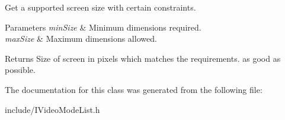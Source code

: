 Get a supported screen size with certain constraints. 


\begin{DoxyParams}{Parameters}
{\em min\+Size} & Minimum dimensions required. \\
\hline
{\em max\+Size} & Maximum dimensions allowed. \\
\hline
\end{DoxyParams}
\begin{DoxyReturn}{Returns}
Size of screen in pixels which matches the requirements. as good as possible. 
\end{DoxyReturn}


The documentation for this class was generated from the following file\+:\begin{DoxyCompactItemize}
\item 
include/I\+Video\+Mode\+List.\+h\end{DoxyCompactItemize}

